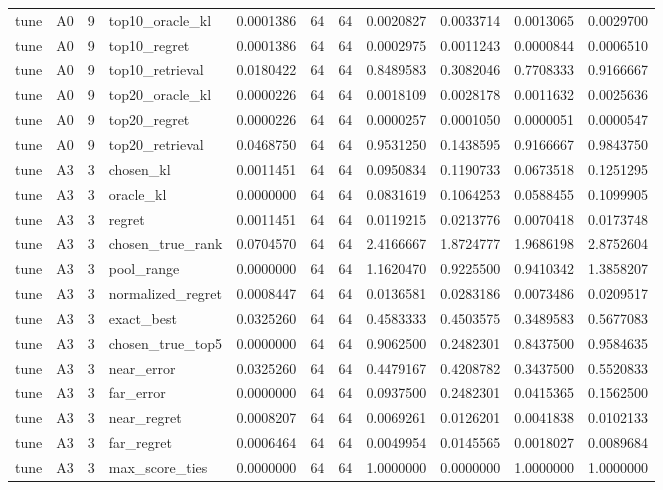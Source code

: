 \begin{tabular}{llrlrrrrrrr}
tune & A0 & 9 & top10_oracle_kl & 0.0001386 & 64 & 64 & 0.0020827 & 0.0033714 & 0.0013065 & 0.0029700 \\
tune & A0 & 9 & top10_regret & 0.0001386 & 64 & 64 & 0.0002975 & 0.0011243 & 0.0000844 & 0.0006510 \\
tune & A0 & 9 & top10_retrieval & 0.0180422 & 64 & 64 & 0.8489583 & 0.3082046 & 0.7708333 & 0.9166667 \\
tune & A0 & 9 & top20_oracle_kl & 0.0000226 & 64 & 64 & 0.0018109 & 0.0028178 & 0.0011632 & 0.0025636 \\
tune & A0 & 9 & top20_regret & 0.0000226 & 64 & 64 & 0.0000257 & 0.0001050 & 0.0000051 & 0.0000547 \\
tune & A0 & 9 & top20_retrieval & 0.0468750 & 64 & 64 & 0.9531250 & 0.1438595 & 0.9166667 & 0.9843750 \\
tune & A3 & 3 & chosen_kl & 0.0011451 & 64 & 64 & 0.0950834 & 0.1190733 & 0.0673518 & 0.1251295 \\
tune & A3 & 3 & oracle_kl & 0.0000000 & 64 & 64 & 0.0831619 & 0.1064253 & 0.0588455 & 0.1099905 \\
tune & A3 & 3 & regret & 0.0011451 & 64 & 64 & 0.0119215 & 0.0213776 & 0.0070418 & 0.0173748 \\
tune & A3 & 3 & chosen_true_rank & 0.0704570 & 64 & 64 & 2.4166667 & 1.8724777 & 1.9686198 & 2.8752604 \\
tune & A3 & 3 & pool_range & 0.0000000 & 64 & 64 & 1.1620470 & 0.9225500 & 0.9410342 & 1.3858207 \\
tune & A3 & 3 & normalized_regret & 0.0008447 & 64 & 64 & 0.0136581 & 0.0283186 & 0.0073486 & 0.0209517 \\
tune & A3 & 3 & exact_best & 0.0325260 & 64 & 64 & 0.4583333 & 0.4503575 & 0.3489583 & 0.5677083 \\
tune & A3 & 3 & chosen_true_top5 & 0.0000000 & 64 & 64 & 0.9062500 & 0.2482301 & 0.8437500 & 0.9584635 \\
tune & A3 & 3 & near_error & 0.0325260 & 64 & 64 & 0.4479167 & 0.4208782 & 0.3437500 & 0.5520833 \\
tune & A3 & 3 & far_error & 0.0000000 & 64 & 64 & 0.0937500 & 0.2482301 & 0.0415365 & 0.1562500 \\
tune & A3 & 3 & near_regret & 0.0008207 & 64 & 64 & 0.0069261 & 0.0126201 & 0.0041838 & 0.0102133 \\
tune & A3 & 3 & far_regret & 0.0006464 & 64 & 64 & 0.0049954 & 0.0145565 & 0.0018027 & 0.0089684 \\
tune & A3 & 3 & max_score_ties & 0.0000000 & 64 & 64 & 1.0000000 & 0.0000000 & 1.0000000 & 1.0000000 \\

\end{tabular}
